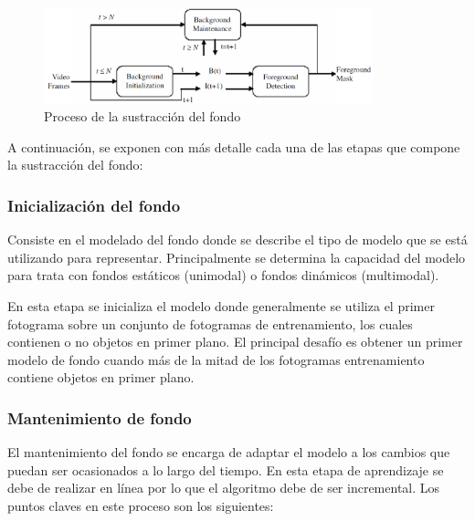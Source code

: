 \begin{figure}[ht]
\centering
\includegraphics[width=0.85\textwidth]{img/chapters/estado-del-arte/background-subtraction-process.png}
\caption{\label{fig:background-subtraction-process}Proceso de la sustracción del fondo \cite{BOUWMANS201431}}
\end{figure}

A continuación, se exponen con más detalle cada una de las etapas que compone la sustracción del fondo:

\subsubsection*{Inicialización del fondo}
\label{subsubsec:inicializacion-del-fondo}

Consiste en el modelado del fondo donde se describe el tipo de modelo que se está utilizando para representar. Principalmente se determina la capacidad del modelo para trata con fondos estáticos (unimodal) o fondos dinámicos (multimodal).

En esta etapa se inicializa el modelo donde generalmente se utiliza el primer fotograma sobre un conjunto de fotogramas de entrenamiento, los cuales contienen o no objetos en primer plano. El principal desafío es obtener un primer modelo de fondo cuando más de la mitad de los fotogramas entrenamiento contiene objetos en primer plano.


\subsubsection*{Mantenimiento de fondo}
\label{subsubsec:mantenimiento-fondo}

El mantenimiento del fondo se encarga de adaptar el modelo a los cambios que puedan ser ocasionados a lo largo del tiempo. En esta etapa de aprendizaje se debe de realizar en línea por lo que el algoritmo debe de ser incremental. Los puntos claves en este proceso son los siguientes:

